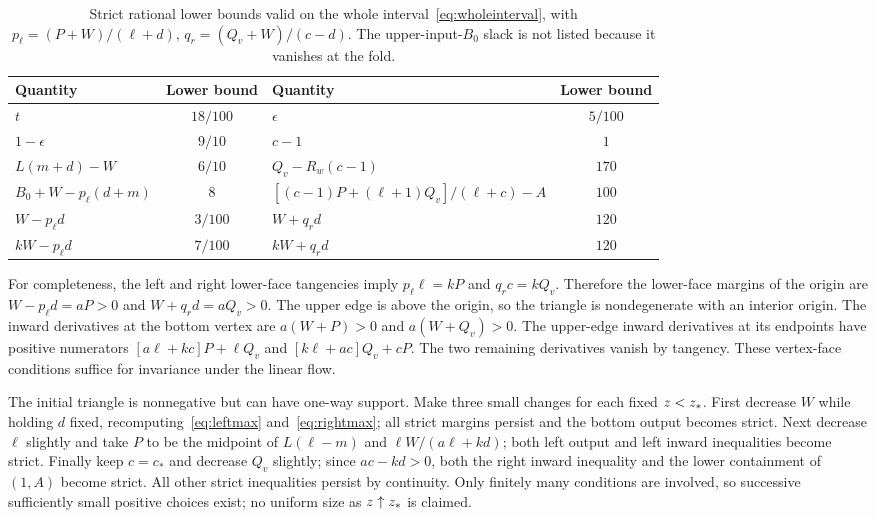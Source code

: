 \begin{table}[ht]
\caption{Strict rational lower bounds valid on the whole interval~\eqref{eq:wholeinterval}, with $p_\ell=(P+W)/(\ell+d)$, $q_r=(Q_v+W)/(c-d)$. The upper-input-$B_0$ slack is not listed because it vanishes at the fold.}\label{tab:margins}
\begin{ruledtabular}
\begin{tabular}{lc@{\qquad}lc}
Quantity & Lower bound & Quantity & Lower bound\\
\hline
$t$ & $18/100$ & $\epsilon$ & $5/100$\\
$1-\epsilon$ & $9/10$ & $c-1$ & $1$\\
$L(m+d)-W$ & $6/10$ & $Q_v-R_w(c-1)$ & $170$\\
$B_0+W-p_\ell(d+m)$ & $8$ & $[(c-1)P+(\ell+1)Q_v]/(\ell+c)-A$ & $100$\\
$W-p_\ell d$ & $3/100$ & $W+q_r d$ & $120$\\
$kW-p_\ell d$ & $7/100$ & $kW+q_r d$ & $120$
\end{tabular}
\end{ruledtabular}
\end{table}

For completeness, the left and right lower-face tangencies imply $p_\ell\ell=kP$ and $q_rc=kQ_v$. Therefore the lower-face margins of the origin are $W-p_\ell d=aP>0$ and $W+q_rd=aQ_v>0$. The upper edge is above the origin, so the triangle is nondegenerate with an interior origin. The inward derivatives at the bottom vertex are $a(W+P)>0$ and $a(W+Q_v)>0$. The upper-edge inward derivatives at its endpoints have positive numerators $[a\ell+kc]P+\ell Q_v$ and $[k\ell+ac]Q_v+cP$. The two remaining derivatives vanish by tangency. These vertex-face conditions suffice for invariance under the linear flow.

The initial triangle is nonnegative but can have one-way support. Make three small changes for each fixed $z<z_*$. First decrease $W$ while holding $d$ fixed, recomputing~\eqref{eq:leftmax} and~\eqref{eq:rightmax}; all strict margins persist and the bottom output becomes strict. Next decrease $\ell$ slightly and take $P$ to be the midpoint of $L(\ell-m)$ and $\ell W/(a\ell+kd)$; both left output and left inward inequalities become strict. Finally keep $c=c_*$ and decrease $Q_v$ slightly; since $ac-kd>0$, both the right inward inequality and the lower containment of $(1,A)$ become strict. All other strict inequalities persist by continuity. Only finitely many conditions are involved, so successive sufficiently small positive choices exist; no uniform size as $z\uparrow z_*$ is claimed.

